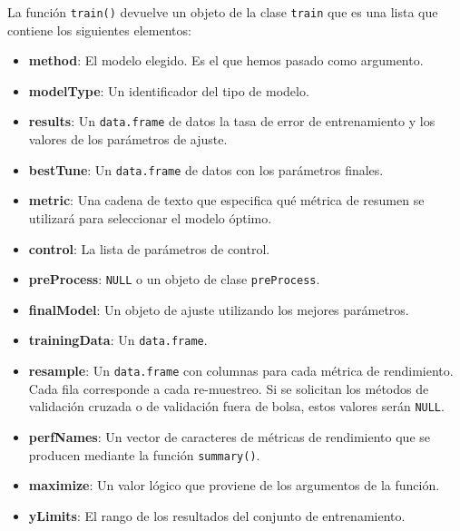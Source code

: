 \documentclass[12pt,spanish,a4paper]{article}
\newenvironment{Shaded}{\begin{snugshade}}{\end{snugshade}}
\newcommand{\KeywordTok}[1]{\textcolor[rgb]{0.13,0.29,0.53}{\textbf{#1}}}
\newcommand{\DataTypeTok}[1]{\textcolor[rgb]{0.13,0.29,0.53}{#1}}
\newcommand{\DecValTok}[1]{\textcolor[rgb]{0.00,0.00,0.81}{#1}}
\newcommand{\StringTok}[1]{\textcolor[rgb]{0.31,0.60,0.02}{#1}}
\newcommand{\OperatorTok}[1]{\textcolor[rgb]{0.81,0.36,0.00}{\textbf{#1}}}
\newcommand{\NormalTok}[1]{#1}
\numberwithin{equation}{section}
\begin{document}
\begin{Shaded}
\end{Shaded}

La función \texttt{train()} devuelve un objeto de la clase
\texttt{train} que es una lista que contiene los siguientes elementos:

\begin{itemize}
\item
  \textbf{method}: El modelo elegido. Es el que hemos pasado como
  argumento.
\item
  \textbf{modelType}: Un identificador del tipo de modelo.
\item
  \textbf{results}: Un \texttt{data.frame} de datos la tasa de error de
  entrenamiento y los valores de los parámetros de ajuste.
\item
  \textbf{bestTune}: Un \texttt{data.frame} de datos con los parámetros
  finales.
\item
  \textbf{metric}: Una cadena de texto que especifica qué métrica de
  resumen se utilizará para seleccionar el modelo óptimo.
\item
  \textbf{control}: La lista de parámetros de control.
\item
  \textbf{preProcess}: \texttt{NULL} o un objeto de clase
  \texttt{preProcess}.
\item
  \textbf{finalModel}: Un objeto de ajuste utilizando los mejores
  parámetros.
\item
  \textbf{trainingData}: Un \texttt{data.frame}.
\item
  \textbf{resample}: Un \texttt{data.frame} con columnas para cada
  métrica de rendimiento. Cada fila corresponde a cada re-muestreo. Si
  se solicitan los métodos de validación cruzada o de validación fuera
  de bolsa, estos valores serán \texttt{NULL}.
\item
  \textbf{perfNames}: Un vector de caracteres de métricas de rendimiento
  que se producen mediante la función \texttt{summary()}.
\item
  \textbf{maximize}: Un valor lógico que proviene de los argumentos de
  la función.
\item
  \textbf{yLimits}: El rango de los resultados del conjunto de
  entrenamiento.
\end{itemize}
\end{document}
